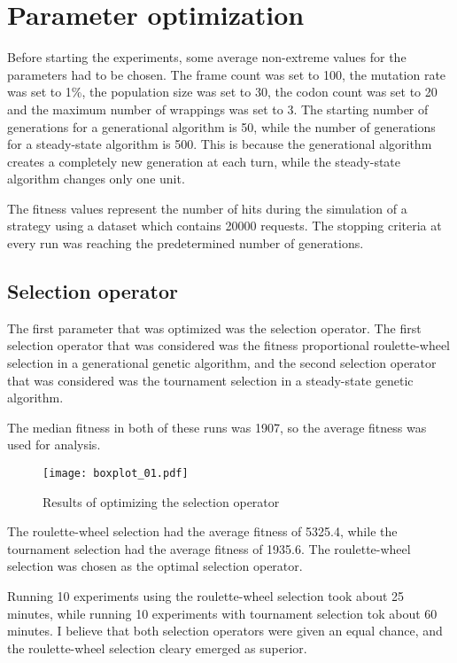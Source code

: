  \section{Parameter optimization}
Before starting the experiments, some average non-extreme values for the parameters had to be chosen. The frame count was set to 100, the mutation rate was set to 1\%, the population size was set to 30, the codon count was set to 20 and the maximum number of wrappings was set to 3. The starting number of generations for a generational algorithm is 50, while the number of generations for a steady-state algorithm is 500. This is because the generational algorithm creates a completely new generation at each turn, while the steady-state algorithm changes only one unit.

The fitness values represent the number of hits during the simulation of a strategy using a dataset which contains 20000 requests. The stopping criteria at every run was reaching the predetermined number of generations.

\subsection{Selection operator}
The first parameter that was optimized was the selection operator. The first selection operator that was considered was the fitness proportional roulette-wheel selection in a generational genetic algorithm, and the second selection operator that was considered was the tournament selection in a steady-state genetic algorithm.

The median fitness in both of these runs was 1907, so the average fitness was used for analysis.

\begin{figure}[H]
	\centering
	\texttt{[image: boxplot\_01.pdf]}
	\caption{Results of optimizing the selection operator}
\end{figure}

The roulette-wheel selection had the average fitness of 5325.4, while the tournament selection had the average fitness of 1935.6. The roulette-wheel selection was chosen as the optimal selection operator.

Running 10 experiments using the roulette-wheel selection took about 25 minutes, while running 10 experiments with tournament selection tok about 60 minutes. I believe that both selection operators were given an equal chance, and the roulette-wheel selection cleary emerged as superior.

